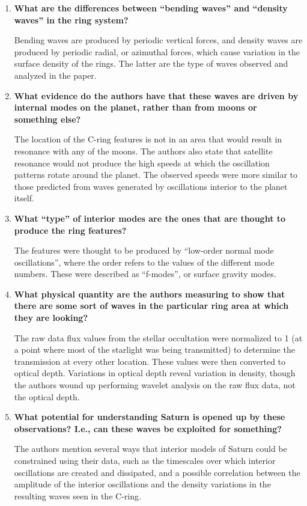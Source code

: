 \documentclass[11pt]{article}
\begin{document}
\begin{enumerate}
    \item \textbf{What are the differences between ``bending waves'' and
    ``density waves'' in the ring system?}

    Bending waves are produced by periodic vertical forces, and
    density waves are produced by periodic radial, or azimuthal
    forces, which cause variation in the surface density of the rings.
    The latter are the type of waves observed and analyzed in the paper.

    \item \textbf{What evidence do the authors have that these waves are
    driven by internal modes on the planet, rather than from moons
    or something else?}

    The location of the C-ring features is not in an area
    that would result in resonance with any of the moons. The authors
    also state that satellite resonance would not produce the high
    speeds at which the oscillation patterns rotate around the planet.
    The observed speeds were more similar to those
    predicted from waves generated by oscillations interior to the
    planet itself.

    \item \textbf{What ``type'' of interior modes are the ones that are thought
    to produce the ring features?}

    The features were thought to be produced by ``low-order normal
    mode oscillations'', where the order refers to the values of the different
    mode numbers. These were described as ``f-modes'', or surface
    gravity modes.

    \item \textbf{What physical quantity are the authors measuring to show
    that there are some sort of waves in the particular ring area
    at which they are looking?}

    The raw data flux values from the stellar occultation
    were normalized to 1 (at a point where most of the starlight
    was being transmitted) to determine the transmission at every
    other location. These values were then converted to optical depth.
    Variations in optical depth reveal variation in density, though
    the authors wound up performing wavelet analysis on the raw flux
    data, not the optical depth.

    \item \textbf{What potential for understanding Saturn is opened up by
    these observations? I.e., can these waves be exploited for something?}

    The authors mention several ways that interior models of Saturn
    could be constrained using their data, such as the timescales over
    which interior oscillations are created and dissipated, and a
    possible correlation between the amplitude of the interior
    oscillations and the density variations in the resulting waves
    seen in the C-ring.


\end{enumerate}
\end{document}
